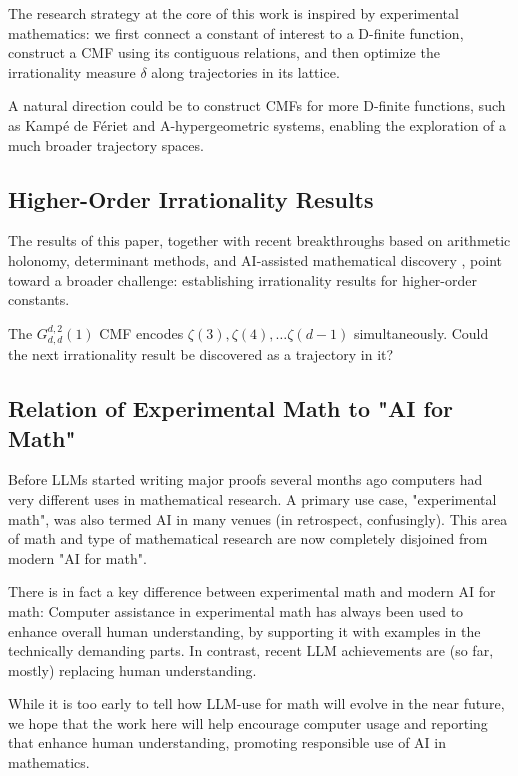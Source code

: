 \documentclass[oneside,english,11pt]{amsart}
\begin{document}
The research strategy at the core of this work is inspired by experimental mathematics: we first connect a constant of interest to a D-finite function, construct a CMF using its contiguous relations, and then optimize the irrationality measure $\delta$ along trajectories in its lattice.

A natural direction could be to construct CMFs for more D-finite functions, such as Kampé de Fériet and A-hypergeometric systems, enabling the exploration of a much broader trajectory spaces.

\subsection{Higher-Order Irrationality Results}

The results of this paper, together with recent breakthroughs based on arithmetic holonomy, determinant methods, and AI-assisted mathematical discovery \cite{calegari2024linear, lai2026zeta34, openai2026catalan}, point toward a broader challenge: establishing irrationality results for higher-order constants.

The \(G_{d,d}^{d,2}(1)\) CMF encodes \(\zeta(3),\zeta(4),\dots\zeta(d-1)\) simultaneously. Could the next irrationality result be discovered as a trajectory in it?

\subsection{Relation of Experimental Math to "AI for Math"}

Before LLMs started writing major proofs several months ago \cite{openai2026planar} computers had very different uses in mathematical research. 
A primary use case, "experimental math", was also termed AI in many venues (in retrospect, confusingly).
This area of math and type of mathematical research are now completely disjoined from modern "AI for math".

There is in fact a key difference between experimental math and modern AI for math: Computer assistance in experimental math has always been used to enhance overall human understanding, by supporting it with examples in the technically demanding parts. 
In contrast, recent LLM achievements are (so far, mostly) replacing human understanding.

While it is too early to tell how LLM-use for math will evolve in the near future, we hope that the work here will help encourage computer usage and reporting that enhance human understanding, promoting responsible use of AI in mathematics.
\end{document}
